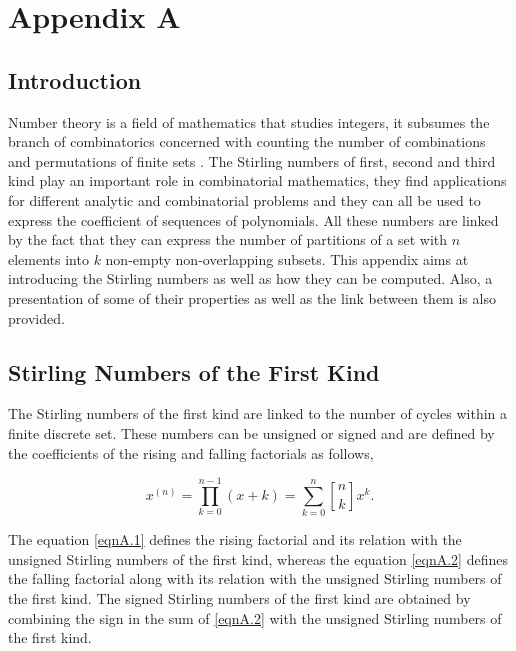 \chapter{Appendix A}
\label{AppendixA}

\section{Introduction}

Number theory is a field of mathematics that studies integers, it subsumes the branch of combinatorics concerned with counting the number of combinations and permutations of finite sets \citep{Laplace1820}. The Stirling numbers of first, second and third kind play an important role in combinatorial mathematics, they find applications for different analytic and combinatorial problems and they can all be used to express the coefficient of sequences of polynomials. All these numbers are linked by the fact that they can express the number of partitions of a set with $n$ elements into $k$ non-empty non-overlapping subsets. This appendix aims at introducing the Stirling numbers as well as how they can be computed. Also, a presentation of some of their properties as well as the link between them is also provided.

\section{Stirling Numbers of the First Kind}

The Stirling numbers of the first kind are linked to the number of cycles within a finite discrete set. These numbers can be unsigned or signed and are defined by the coefficients of the rising and falling factorials as follows,

\begin{equation} \label{eqnA.1}
x^{(n)} = \prod_{k=0}^{n-1} (x+k) = \sum_{k=0}^{n} \genfrac{[}{]}{0pt}{0}{n}{k} x^{k}.
\end{equation}

The equation \eqref{eqnA.1} defines the rising factorial and its relation with the unsigned Stirling numbers of the first kind, whereas the equation \eqref{eqnA.2} defines the falling factorial along with its relation with the unsigned Stirling numbers of the first kind. The signed Stirling numbers of the first kind are obtained by combining the sign in the sum of \eqref{eqnA.2} with the unsigned Stirling numbers of the first kind.

